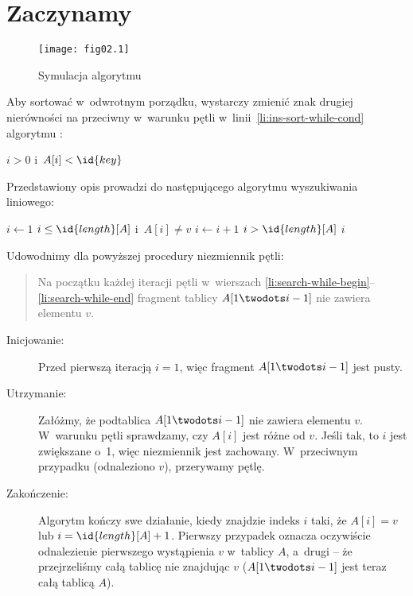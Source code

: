 \chapter{Zaczynamy}


\exercise{} %
\begin{figure}[!h]
	\begin{center}
		\texttt{[image: fig02.1]}
	\end{center}
	\caption{Symulacja algorytmu }
\end{figure}

\exercise{} %
Aby sortować w~odwrotnym porządku, wystarczy zmienić znak drugiej nierówności na przeciwny w~warunku pętli  w~linii~\ref{li:ins-sort-while-cond} algorytmu :
\begin{codebox}
\setcounter{codelinenumber}{4}
\li	\While $i>0$ i~$A[i]<\id{key}$
\end{codebox}

\exercise{} %
Przedstawiony opis prowadzi do następującego algorytmu wyszukiwania liniowego:
\begin{codebox}
\li	$i\gets 1$
\li	\While $i\le\id{length}[A]$ i~$A[i]\ne v$ \label{li:search-while-begin}
\li		\Do
			$i\gets i+1$
		\End \label{li:search-while-end}
\li	\If $i>\id{length}[A]$
\li		\Then \label{li:ins-sort-while-cond}
			\Return {}
\li		\Else
			\Return $i$
		\End
\end{codebox}
Udowodnimy dla powyższej procedury niezmiennik pętli:
\begin{quote}
Na początku każdej iteracji pętli  w~wierszach \ref{li:search-while-begin}\nobreakdash--\ref{li:search-while-end} fragment tablicy $A[1\twodots i-1]$ nie zawiera elementu $v$.
\end{quote}
\begin{description}
	\item[Inicjowanie:] Przed pierwszą iteracją $i=1$, więc fragment $A[1\twodots i-1]$ jest pusty.
	\item[Utrzymanie:] Załóżmy, że podtablica $A[1\twodots i-1]$ nie zawiera elementu $v$. W~warunku pętli  sprawdzamy, czy $A[i]$ jest różne od $v$. Jeśli tak, to $i$ jest zwiększane o~1, więc niezmiennik jest zachowany. W~przeciwnym przypadku (odnaleziono $v$), przerywamy pętlę.
	\item[Zakończenie:] Algorytm kończy swe działanie, kiedy znajdzie indeks $i$ taki, że $A[i]=v$ lub $i=\id{length}[A]+1$. Pierwszy przypadek oznacza oczywiście odnalezienie pierwszego wystąpienia $v$ w~tablicy $A$, a~drugi -- że przejrzeliśmy całą tablicę nie znajdując $v$ ($A[1\twodots i-1]$ jest teraz całą tablicą $A$).
\end{description}

